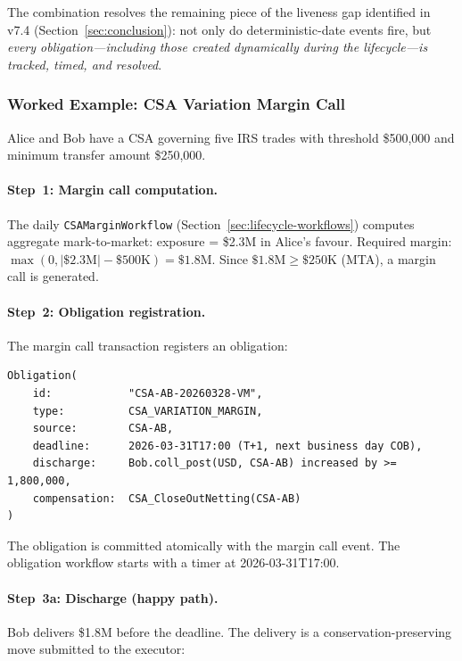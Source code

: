 \documentclass[11pt,a4paper]{article}
\begin{document}
\noindent The combination resolves the remaining piece of the liveness gap identified in v7.4 (Section~\ref{sec:conclusion}): not only do deterministic-date events fire, but \emph{every obligation---including those created dynamically during the lifecycle---is tracked, timed, and resolved}.

\subsubsection{Worked Example: CSA Variation Margin Call}
\label{sec:obligation-example-csa}

Alice and Bob have a CSA governing five IRS trades with threshold \$500{,}000 and minimum transfer amount \$250{,}000.

\paragraph{Step~1: Margin call computation.} The daily \texttt{CSAMarginWorkflow} (Section~\ref{sec:lifecycle-workflows}) computes aggregate mark-to-market: exposure = \$2.3M in Alice's favour. Required margin: $\max(0, |\$2.3\text{M}| - \$500\text{K}) = \$1.8\text{M}$. Since $\$1.8\text{M} \geq \$250\text{K}$ (MTA), a margin call is generated.

\paragraph{Step~2: Obligation registration.} The margin call transaction registers an obligation:
\begin{lstlisting}
Obligation(
    id:            "CSA-AB-20260328-VM",
    type:          CSA_VARIATION_MARGIN,
    source:        CSA-AB,
    deadline:      2026-03-31T17:00 (T+1, next business day COB),
    discharge:     Bob.coll_post(USD, CSA-AB) increased by >= 1,800,000,
    compensation:  CSA_CloseOutNetting(CSA-AB)
)
\end{lstlisting}

\noindent The obligation is committed atomically with the margin call event. The obligation workflow starts with a timer at 2026-03-31T17:00.

\paragraph{Step~3a: Discharge (happy path).} Bob delivers \$1.8M before the deadline. The delivery is a conservation-preserving move submitted to the executor:
\end{document}
